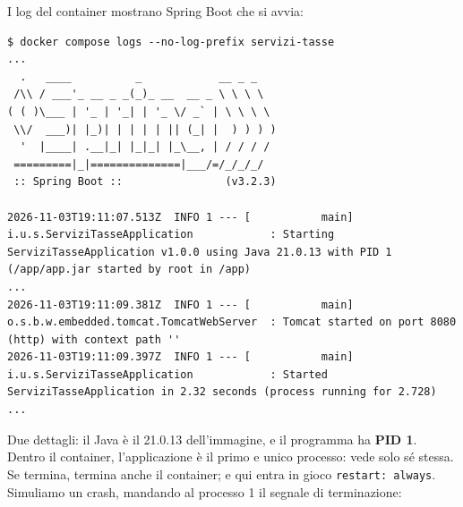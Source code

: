 

I log del container mostrano Spring Boot che si avvia:

\begin{lstlisting}[style=shell, name=Terminale]
$ docker compose logs --no-log-prefix servizi-tasse
...
  .   ____          _            __ _ _
 /\\ / ___'_ __ _ _(_)_ __  __ _ \ \ \ \
( ( )\___ | '_ | '_| | '_ \/ _` | \ \ \ \
 \\/  ___)| |_)| | | | | || (_| |  ) ) ) )
  '  |____| .__|_| |_|_| |_\__, | / / / /
 =========|_|==============|___/=/_/_/_/
 :: Spring Boot ::                (v3.2.3)

2026-11-03T19:11:07.513Z  INFO 1 --- [           main] i.u.s.ServiziTasseApplication            : Starting ServiziTasseApplication v1.0.0 using Java 21.0.13 with PID 1 (/app/app.jar started by root in /app)
...
2026-11-03T19:11:09.381Z  INFO 1 --- [           main] o.s.b.w.embedded.tomcat.TomcatWebServer  : Tomcat started on port 8080 (http) with context path ''
2026-11-03T19:11:09.397Z  INFO 1 --- [           main] i.u.s.ServiziTasseApplication            : Started ServiziTasseApplication in 2.32 seconds (process running for 2.728)
...
\end{lstlisting}

Due dettagli: il Java è il 21.0.13 dell'immagine, e il programma ha \textbf{PID 1}. Dentro il container,
l'applicazione è il primo e unico processo: vede solo sé stessa. Se termina, termina anche il container; e qui
entra in gioco \texttt{restart: always}. Simuliamo un crash, mandando al processo 1 il segnale di terminazione:

